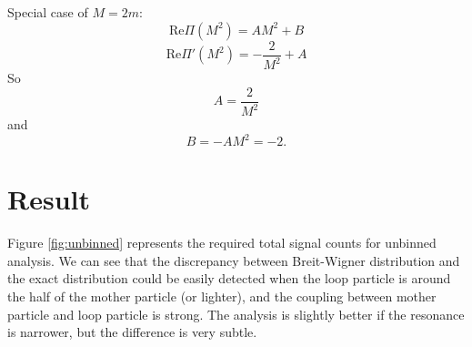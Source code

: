 \documentclass[10pt]{article}
\theoremstyle{definition}
\theoremstyle{remark}
\begin{document}
	Special case of $M=2m$:
	\[\mathrm{Re}\Pi(M^{2})=AM^{2}+B\]
	\[\mathrm{Re}\Pi'(M^{2})=-\frac{2}{M^{2}}+A\]
	So
	\[A=\frac{2}{M^{2}}\]
	and
	\[B=-AM^{2}=-2.\]
	
	\section{Result}
	Figure \ref{fig:unbinned} represents the required total signal counts for unbinned analysis.
	We can see that the discrepancy between Breit-Wigner distribution and the exact distribution could be easily detected when the loop particle is around the half of the mother particle (or lighter), and the coupling between mother particle and loop particle is strong.
	The analysis is slightly better if the resonance is narrower, but the difference is very subtle.
	
\end{document}
